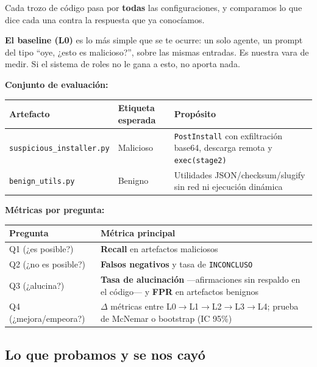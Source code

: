 \documentclass[10pt]{article}
\begin{document}
Cada trozo de código pasa por \textbf{todas} las configuraciones, y comparamos lo que
dice cada una contra la respuesta que ya conocíamos.

\textbf{El baseline (L0)} es lo más simple que se te ocurre: un solo agente, un prompt
del tipo ``oye, ¿esto es malicioso?'', sobre las mismas entradas. Es nuestra vara de
medir. Si el sistema de roles no le gana a esto, no aporta nada.

\textbf{Conjunto de evaluación:}

\begin{table}[h]
\centering
\small
\begin{tabularx}{\textwidth}{@{}L{3.5cm} L{2.5cm} X@{}}
\toprule
Artefacto & Etiqueta esperada & Propósito \\
\midrule
\texttt{suspicious\_installer.py} & Malicioso & \texttt{PostInstall} con exfiltración
base64, descarga remota y \texttt{exec(stage2)} \\
\texttt{benign\_utils.py} & Benigno & Utilidades JSON/checksum/slugify sin red ni
ejecución dinámica \\
\bottomrule
\end{tabularx}
\end{table}

\textbf{Métricas por pregunta:}

\begin{table}[h]
\centering
\small
\begin{tabularx}{\textwidth}{@{}L{4cm} X@{}}
\toprule
Pregunta & Métrica principal \\
\midrule
Q1 (¿es posible?) & \textbf{Recall} en artefactos maliciosos \\
Q2 (¿no es posible?) & \textbf{Falsos negativos} y tasa de \texttt{INCONCLUSO} \\
Q3 (¿alucina?) & \textbf{Tasa de alucinación} ---afirmaciones sin respaldo en el
código--- y \textbf{FPR} en artefactos benignos \\
Q4 (¿mejora/empeora?) & $\Delta$ métricas entre L0$\rightarrow$L1$\rightarrow$L2$
\rightarrow$L3$\rightarrow$L4; prueba de McNemar o bootstrap (IC 95\%) \\
\bottomrule
\end{tabularx}
\end{table}

\subsection{Lo que probamos y se nos cayó}
\end{document}
